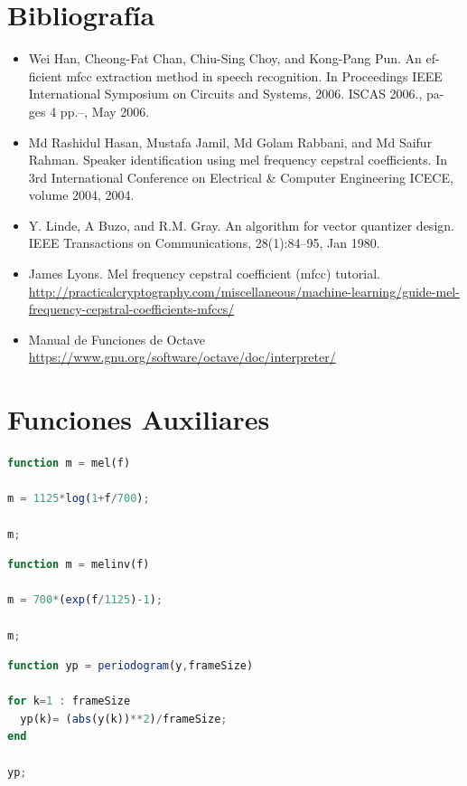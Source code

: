 \documentclass[a4paper,10pt]{article}
\begin{document}
\section{Bibliografía}
\begin{itemize}

\item Wei Han, Cheong-Fat Chan, Chiu-Sing Choy, and Kong-Pang Pun. An ef- ficient mfcc extraction method in speech recognition. In Proceedings IEEE International Symposium on Circuits and Systems, 2006. ISCAS 2006., pa- ges 4 pp.–, May 2006.
\item Md Rashidul Hasan, Mustafa Jamil, Md Golam Rabbani, and Md Saifur Rahman. Speaker identification using mel frequency cepstral coefficients. In 3rd International Conference on Electrical \& Computer Engineering ICECE, volume 2004, 2004.
\item Y. Linde, A Buzo, and R.M. Gray. An algorithm for vector quantizer design. IEEE Transactions on Communications, 28(1):84–95, Jan 1980.
\item James Lyons. Mel frequency cepstral coefficient (mfcc) tutorial. 
\url{http://practicalcryptography.com/miscellaneous/machine-learning/guide-mel-frequency-cepstral-coefficients-mfccs/}
\item Manual de Funciones de Octave \url{https://www.gnu.org/software/octave/doc/interpreter/}
\end{itemize} 

\section{Funciones Auxiliares}

\begin{lstlisting}[language=Octave, caption = Mel]
function m = mel(f)

m = 1125*log(1+f/700);

m;
\end{lstlisting}

\begin{lstlisting}[language=Octave, caption = Mel Inversa]
function m = melinv(f)

m = 700*(exp(f/1125)-1);

m;
\end{lstlisting}

\begin{lstlisting}[language=Octave, caption = Periodogram]
function yp = periodogram(y,frameSize)

for k=1 : frameSize
  yp(k)= (abs(y(k))**2)/frameSize;
end

yp;
\end{lstlisting}
\end{document}
